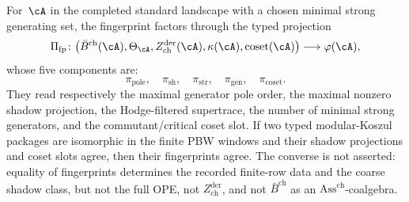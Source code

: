 \begin{theorem}
\label{thm:fingerprint-completeness}
\ClaimStatusConditional
For~$\cA$ in the completed standard landscape with a chosen minimal
strong generating set, the fingerprint factors through the typed
projection
\begin{equation}\label{eq:fingerprint-completeness}
\Pi_{\mathrm{fp}}\colon
\bigl(\bar B^{\mathrm{ch}}(\cA),\Theta_\cA,
Z^{\mathrm{der}}_{\mathrm{ch}}(\cA),\kappa(\cA),
\mathrm{coset}(\cA)\bigr)
\longrightarrow
\varphi(\cA),
\end{equation}
whose five components are:
\[
\pi_{\mathrm{pole}},\quad
\pi_{\mathrm{sh}},\quad
\pi_{\mathrm{str}},\quad
\pi_{\mathrm{gen}},\quad
\pi_{\mathrm{coset}}.
\]
They read respectively the maximal generator pole order, the maximal
nonzero shadow projection, the Hodge-filtered supertrace, the number
of minimal strong generators, and the commutant/critical coset slot.
If two typed modular-Koszul packages are isomorphic in the finite
PBW windows and their shadow projections and coset slots agree, then
their fingerprints agree. The converse is not asserted: equality of
fingerprints determines the recorded finite-row data and the coarse
shadow class, but not the full OPE, not
$Z^{\mathrm{der}}_{\mathrm{ch}}$, and not
$\bar B^{\mathrm{ch}}$ as an $\mathrm{Ass}^{\mathrm{ch}}$-coalgebra.
\end{theorem}

